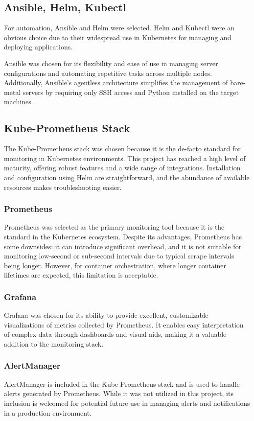 \subsection{Ansible, Helm, Kubectl}
For automation, Ansible and Helm were selected. Helm and Kubectl were an obvious choice due to their widespread use in Kubernetes for managing and deploying applications.

Ansible was chosen for its flexibility and ease of use in managing server configurations and automating repetitive tasks across multiple nodes. Additionally, Ansible's agentless architecture simplifies the management of bare-metal servers by requiring only SSH access and Python installed on the target machines.

\subsection{Kube-Prometheus Stack}
The Kube-Prometheus stack was chosen because it is the de-facto standard for monitoring in Kubernetes environments. This project has reached a high level of maturity, offering robust features and a wide range of integrations. Installation and configuration using Helm are straightforward, and the abundance of available resources makes troubleshooting easier.

\subsubsection{Prometheus}
Prometheus was selected as the primary monitoring tool because it is the standard in the Kubernetes ecosystem. Despite its advantages, Prometheus has some downsides: it can introduce significant overhead, and it is not suitable for monitoring low-second or sub-second intervals due to typical scrape intervals being longer. However, for container orchestration, where longer container lifetimes are expected, this limitation is acceptable.

\subsubsection{Grafana}
Grafana was chosen for its ability to provide excellent, customizable visualizations of metrics collected by Prometheus. It enables easy interpretation of complex data through dashboards and visual aids, making it a valuable addition to the monitoring stack.

\subsubsection{AlertManager}
AlertManager is included in the Kube-Prometheus stack and is used to handle alerts generated by Prometheus. While it was not utilized in this project, its inclusion is welcomed for potential future use in managing alerts and notifications in a production environment.


